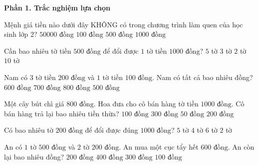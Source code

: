 \textbf{Phần 1. Trắc nghiệm lựa chọn}

\begin{ex} %
Mệnh giá tiền nào dưới đây KHÔNG có trong chương trình làm quen của học sinh lớp 2?
\choice
{\True $50 000\text{ đồng}$}
{$100\text{ đồng}$}
{$500\text{ đồng}$}
{$1 000\text{ đồng}$}
\end{ex}

\begin{ex} %
Cần bao nhiêu tờ tiền $500\text{ đồng}$ để đổi được $1$ tờ tiền $1 000\text{ đồng}$?
\choice
{$5$ tờ}
{$3$ tờ}
{\True $2$ tờ}
{$10$ tờ}
\end{ex}

\begin{ex} %
Nam có $3$ tờ tiền $200\text{ đồng}$ và $1$ tờ tiền $100\text{ đồng}$. Nam có tất cả bao nhiêu đồng?
\choice
{$600\text{ đồng}$}
{\True $700\text{ đồng}$}
{$800\text{ đồng}$}
{$500\text{ đồng}$}
\end{ex}

\begin{ex} %
Một cây bút chì giá $800\text{ đồng}$. Hoa đưa cho cô bán hàng tờ tiền $1 000\text{ đồng}$. Cô bán hàng trả lại bao nhiêu tiền thừa?
\choice
{$100\text{ đồng}$}
{$300\text{ đồng}$}
{$50\text{ đồng}$}
{\True $200\text{ đồng}$}
\end{ex}

\begin{ex} %
Có bao nhiêu tờ $200\text{ đồng}$ để đổi được đúng $1 000\text{ đồng}$?
\choice
{\True $5$ tờ}
{$4$ tờ}
{$6$ tờ}
{$2$ tờ}
\end{ex}

\begin{ex} %
An có $1$ tờ $500\text{ đồng}$ và $2$ tờ $200\text{ đồng}$. An mua một cục tẩy hết $600\text{ đồng}$. An còn lại bao nhiêu đồng?
\choice
{$200\text{ đồng}$}
{$400\text{ đồng}$}
{\True $300\text{ đồng}$}
{$100\text{ đồng}$}
\end{ex}


